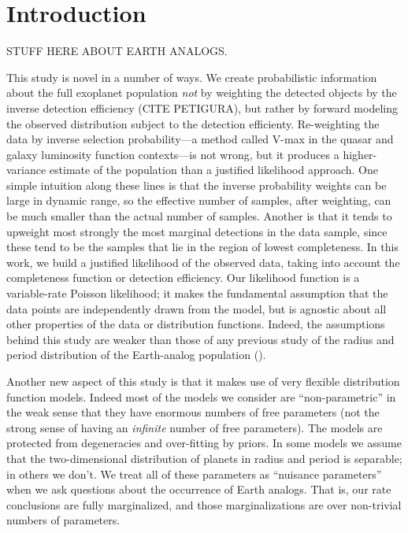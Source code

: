 \documentclass[12pt,preprint]{aastex}
\begin{document}

\section{Introduction}

STUFF HERE ABOUT EARTH ANALOGS.

This study is novel in a number of ways.
We create probabilistic information about the full exoplanet population
\emph{not} by weighting the detected objects by the inverse detection
efficiency (CITE PETIGURA), but rather by forward modeling the observed
distribution subject to the detection efficienty.
Re-weighting the data by inverse selection probability---a method called
V-max in the quasar and galaxy luminosity function contexts---is not wrong,
but it produces a higher-variance estimate of the population than a justified
likelihood approach.
One simple intuition along these lines is that the inverse probability weights
can be large in dynamic range, so the effective number of samples, after
weighting, can be much smaller than the actual number of samples.
Another is that it tends to upweight most strongly the most marginal
detections in the data sample, since these tend to be the samples that lie in
the region of lowest completeness.  In this work, we build a justified
likelihood of the observed data, taking into account the completeness function
or detection efficiency.
Our likelihood function is a variable-rate Poisson likelihood; it makes the
fundamental assumption that the data points are independently drawn from the
model, but is agnostic about all other properties of the data or distribution
functions.
Indeed, the assumptions behind this study are weaker than those of any
previous study of the radius and period distribution of the Earth-analog
population (\citealt{dong, petigura}).

Another new aspect of this study is that it makes use of very flexible
distribution function models.
Indeed most of the models we consider are ``non-parametric'' in the weak sense
that they have enormous numbers of free parameters (not the strong sense of
having an \emph{infinite} number of free parameters).
The models are protected from degeneracies and over-fitting by priors.
In some models we assume that the two-dimensional distribution of planets in
radius and period is separable; in others we don't.
We treat all of these parameters as ``nuisance parameters'' when we ask
questions about the occurrence of Earth analogs.
That is, our rate conclusions are fully marginalized, and those
marginalizations are over non-trivial numbers of parameters.
\end{document}
